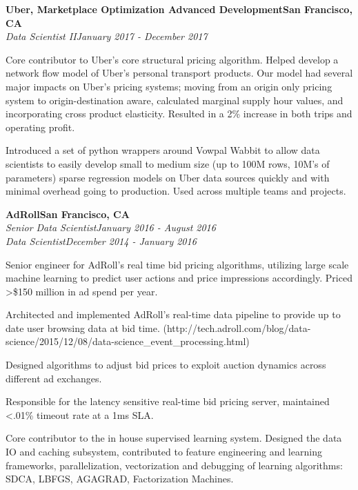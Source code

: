 \documentclass{article}
\newcommand{\leftandright}[2]{\noindent\textbf{#1}\hfill\textbf{#2}}
\newcommand{\leftandrighti}[2]{\indent\textit{#1}\hfill\textit{#2}}
\begin{document}
\leftandright{Uber, Marketplace Optimization Advanced Development}{San Francisco, CA} \\
\leftandrighti{Data Scientist II}
	      {January 2017 - December 2017}
\begin{itemize*}
\item Core contributor to Uber's core structural pricing algorithm. Helped develop a network flow model of Uber's personal transport products. Our model had several major impacts on Uber's pricing systems; moving from an origin only pricing system to origin-destination aware, calculated marginal supply hour values, and incorporating cross product elasticity. Resulted in a 2\% increase in both trips and operating profit.
\item Introduced a set of python wrappers around Vowpal Wabbit to allow data scientists to easily develop small to medium size (up to 100M rows, 10M's of parameters) sparse regression models on Uber data sources quickly and with minimal overhead going to production. Used across multiple teams and projects.
\end{itemize*}

\leftandright{AdRoll}{San Francisco, CA} \\
\leftandrighti{Senior Data Scientist}
	      {January 2016 - August 2016}\\
\leftandrighti{Data Scientist}
	      {December 2014 - January 2016}

\begin{itemize*}
\item Senior engineer for AdRoll's real time bid pricing algorithms, utilizing
  large scale machine learning to predict user actions and price impressions accordingly.
  Priced \textgreater \$150 million in ad spend per year.
\item Architected and implemented AdRoll's real-time data pipeline to provide up to date
  user browsing data at bid time. (http://tech.adroll.com/blog/data-science/2015/12/08/data-science\_event\_processing.html)
\item Designed algorithms to adjust bid prices to exploit auction dynamics across
  different ad exchanges.
\item Responsible for the latency sensitive real-time bid pricing server,
  maintained \textless .01\% timeout rate at a 1ms SLA.
\item Core contributor to the in house supervised learning system. Designed the
  data IO and caching subsystem, contributed to feature engineering and learning frameworks,
  parallelization, vectorization and debugging of learning algorithms: SDCA, LBFGS, AGAGRAD,
  Factorization Machines.
\end{itemize*}
\end{document}

